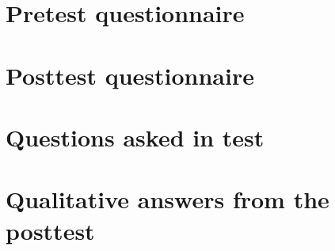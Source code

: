 \begin{appendices}


\section{Pretest questionnaire}\label{app:pretest}
 \clearpage


\section{Posttest questionnaire}\label{app:posttest}
 \clearpage


\section{Questions asked in test}\label{app:questions}
 \clearpage



\section{Qualitative answers from the posttest}\label{app:qualitative-answers-posttest}
 \clearpage

\end{appendices}